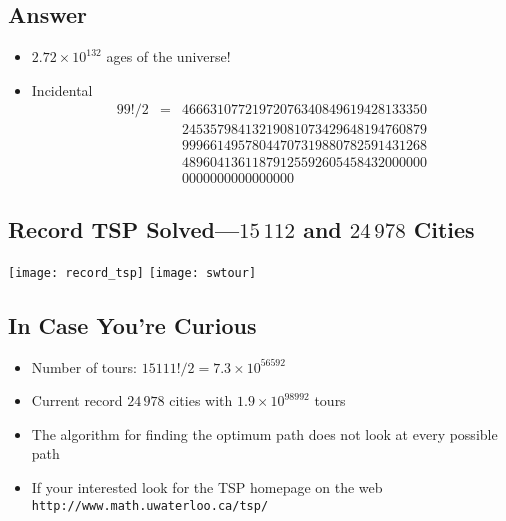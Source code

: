 
\begin{slide}
\section{Answer}
\pause

\begin{itemize}
\item $2.72\times10^{132}$ ages of the universe!\pause
\item Incidental
  \begin{eqnarray*}
    99!/2 &=&
    46663107721972076340849619428133350\\
    &&24535798413219081073429648194760879\\
    &&99966149578044707319880782591431268\\
    &&48960413611879125592605458432000000\\
    &&0000000000000000
  \end{eqnarray*}\pause
\end{itemize}

\end{slide}


\begin{slide}
\section{Record TSP Solved---$15\,112$ and $24\,978$ Cities}
\vspace{-2cm}
\begin{center}
  \texttt{[image: record\_tsp]}\hspace{1cm}
  \texttt{[image: swtour]}
\end{center}
\vspace{-2cm}
\end{slide}


\begin{slide}
\section{In Case You're Curious}
\begin{itemize}
\item Number of tours: $15111!/2 = 7.3\times10^{56592}$\pause
\item Current record $24\,978$ cities with $1.9\times10^{98992}$ tours\pause
\item The algorithm for finding the optimum path does not look at every
  possible path\pause
\item If your interested look for the TSP homepage on the web\\
  \texttt{http://www.math.uwaterloo.ca/tsp/}\pause
\end{itemize}

\end{slide}

